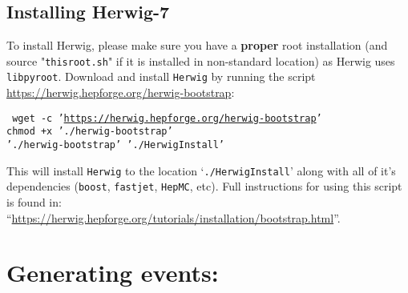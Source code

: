 \subsection{Installing Herwig-7}
To install Herwig, please make sure you have a {\bf proper} root installation (and source "{\tt thisroot.sh}" if it is installed in non-standard location) as Herwig uses {\tt libpyroot}.
Download and install {\tt Herwig} by running the script \url{https://herwig.hepforge.org/herwig-bootstrap}:
\begin{center}
    \begin{minipage}{0.7\textwidth}
        {\tt
            wget -c '\url{https://herwig.hepforge.org/herwig-bootstrap}'\\
            chmod +x './herwig-bootstrap'\\
            './herwig-bootstrap' './HerwigInstall'
        }
    \end{minipage}
\end{center}
This will install {\tt Herwig} to the location `{\tt ./HerwigInstall}' along with all of it's dependencies ({\tt boost}, {\tt fastjet}, {\tt HepMC}, etc).
Full instructions for using this script is found in:\\
``\small{\url{https://herwig.hepforge.org/tutorials/installation/bootstrap.html}}''.

\section{Generating events:}
